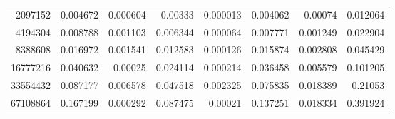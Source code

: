 \begin{tabular}{r r r r r r r r}
2097152 & 0.004672 & 0.000604 & 0.00333 & 0.000013 & 0.004062 & 0.00074 & 0.012064 \\
4194304 & 0.008788 & 0.001103 & 0.006344 & 0.000064 & 0.007771 & 0.001249 & 0.022904 \\
8388608 & 0.016972 & 0.001541 & 0.012583 & 0.000126 & 0.015874 & 0.002808 & 0.045429 \\
16777216 & 0.040632 & 0.00025 & 0.024114 & 0.000214 & 0.036458 & 0.005579 & 0.101205 \\
33554432 & 0.087177 & 0.006578 & 0.047518 & 0.002325 & 0.075835 & 0.018389 & 0.21053 \\
67108864 & 0.167199 & 0.000292 & 0.087475 & 0.00021 & 0.137251 & 0.018334 & 0.391924 \\
\end{tabular}